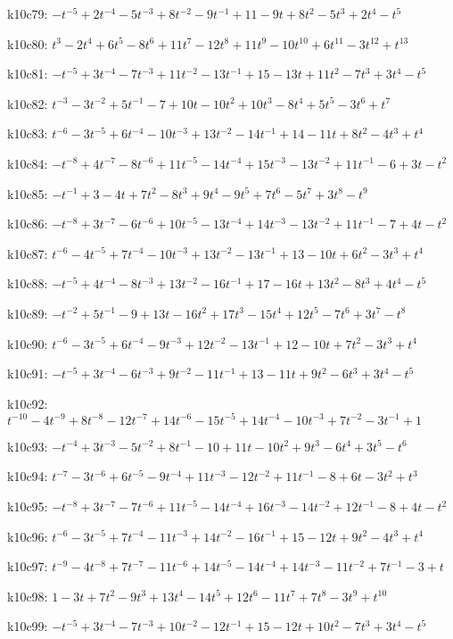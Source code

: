 k10c79: $-t^{-5}+2t^{-4}-5t^{-3}+8t^{-2}-9t^{-1}+11-9t+8t^{2}-5t^{3}+2t^{4}-t^{5}$

k10c80: $t^{3}-2t^{4}+6t^{5}-8t^{6}+11t^{7}-12t^{8}+11t^{9}-10t^{10}+6t^{11}-3t^{12}+t^{13}$

k10c81: $-t^{-5}+3t^{-4}-7t^{-3}+11t^{-2}-13t^{-1}+15-13t+11t^{2}-7t^{3}+3t^{4}-t^{5}$

k10c82: $t^{-3}-3t^{-2}+5t^{-1}-7+10t-10t^{2}+10t^{3}-8t^{4}+5t^{5}-3t^{6}+t^{7}$

k10c83: $t^{-6}-3t^{-5}+6t^{-4}-10t^{-3}+13t^{-2}-14t^{-1}+14-11t+8t^{2}-4t^{3}+t^{4}$

k10c84: $-t^{-8}+4t^{-7}-8t^{-6}+11t^{-5}-14t^{-4}+15t^{-3}-13t^{-2}+11t^{-1}-6+3t-t^{2}$

k10c85: $-t^{-1}+3-4t+7t^{2}-8t^{3}+9t^{4}-9t^{5}+7t^{6}-5t^{7}+3t^{8}-t^{9}$

k10c86: $-t^{-8}+3t^{-7}-6t^{-6}+10t^{-5}-13t^{-4}+14t^{-3}-13t^{-2}+11t^{-1}-7+4t-t^{2}$

k10c87: $t^{-6}-4t^{-5}+7t^{-4}-10t^{-3}+13t^{-2}-13t^{-1}+13-10t+6t^{2}-3t^{3}+t^{4}$

k10c88: $-t^{-5}+4t^{-4}-8t^{-3}+13t^{-2}-16t^{-1}+17-16t+13t^{2}-8t^{3}+4t^{4}-t^{5}$

k10c89: $-t^{-2}+5t^{-1}-9+13t-16t^{2}+17t^{3}-15t^{4}+12t^{5}-7t^{6}+3t^{7}-t^{8}$

k10c90: $t^{-6}-3t^{-5}+6t^{-4}-9t^{-3}+12t^{-2}-13t^{-1}+12-10t+7t^{2}-3t^{3}+t^{4}$

k10c91: $-t^{-5}+3t^{-4}-6t^{-3}+9t^{-2}-11t^{-1}+13-11t+9t^{2}-6t^{3}+3t^{4}-t^{5}$

k10c92: $t^{-10}-4t^{-9}+8t^{-8}-12t^{-7}+14t^{-6}-15t^{-5}+14t^{-4}-10t^{-3}+7t^{-2}-3t^{-1}+1$

k10c93: $-t^{-4}+3t^{-3}-5t^{-2}+8t^{-1}-10+11t-10t^{2}+9t^{3}-6t^{4}+3t^{5}-t^{6}$

k10c94: $t^{-7}-3t^{-6}+6t^{-5}-9t^{-4}+11t^{-3}-12t^{-2}+11t^{-1}-8+6t-3t^{2}+t^{3}$

k10c95: $-t^{-8}+3t^{-7}-7t^{-6}+11t^{-5}-14t^{-4}+16t^{-3}-14t^{-2}+12t^{-1}-8+4t-t^{2}$

k10c96: $t^{-6}-3t^{-5}+7t^{-4}-11t^{-3}+14t^{-2}-16t^{-1}+15-12t+9t^{2}-4t^{3}+t^{4}$

k10c97: $t^{-9}-4t^{-8}+7t^{-7}-11t^{-6}+14t^{-5}-14t^{-4}+14t^{-3}-11t^{-2}+7t^{-1}-3+t$

k10c98: $1-3t+7t^{2}-9t^{3}+13t^{4}-14t^{5}+12t^{6}-11t^{7}+7t^{8}-3t^{9}+t^{10}$

k10c99: $-t^{-5}+3t^{-4}-7t^{-3}+10t^{-2}-12t^{-1}+15-12t+10t^{2}-7t^{3}+3t^{4}-t^{5}$

